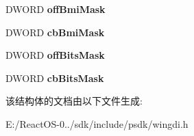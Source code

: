 \begin{DoxyCompactItemize}
\item 
\mbox{\label{structtag_e_m_r_m_a_s_k_b_l_t_af10685dbf6138fe0948067ca4935ccfb}} 
D\+W\+O\+RD {\bfseries off\+Bmi\+Mask}
\item 
\mbox{\label{structtag_e_m_r_m_a_s_k_b_l_t_a767bba747624e13b7c3497c71bb89e2c}} 
D\+W\+O\+RD {\bfseries cb\+Bmi\+Mask}
\item 
\mbox{\label{structtag_e_m_r_m_a_s_k_b_l_t_a10a5f6b6ace108252fa7d37f5a60c2e9}} 
D\+W\+O\+RD {\bfseries off\+Bits\+Mask}
\item 
\mbox{\label{structtag_e_m_r_m_a_s_k_b_l_t_abdda0136a0c419815d91470e3018b134}} 
D\+W\+O\+RD {\bfseries cb\+Bits\+Mask}
\end{DoxyCompactItemize}


该结构体的文档由以下文件生成\+:\begin{DoxyCompactItemize}
\item 
E\+:/\+React\+O\+S-\/0../sdk/include/psdk/wingdi.\+h\end{DoxyCompactItemize}
